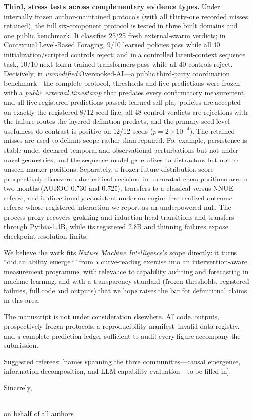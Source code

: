 \documentclass[11pt]{article}
\begin{document}
\textbf{Third, stress tests across complementary evidence types.} Under
internally frozen author-maintained protocols (with all thirty-one
recorded misses retained), the full six-component protocol is tested in
three built domains and one public benchmark. It classifies 25/25 fresh
external-swarm verdicts; in Contextual Level-Based Foraging, 9/10
learned policies pass while all 40 initialization/scripted controls
reject; and in a controlled latent-context sequence task, 10/10
next-token-trained transformers pass while all 40 controls reject.
Decisively, in \emph{unmodified} Overcooked-AI---a public third-party
coordination benchmark---the complete protocol, thresholds and five
predictions were frozen with a \emph{public external timestamp} that
predates every confirmatory measurement, and all five registered
predictions passed: learned self-play policies are accepted on exactly
the registered 8/12 seed line, all 48 control verdicts are rejections
with the failure routes the layered definition predicts, and the
primary seed-level usefulness do-contrast is positive on 12/12 seeds
($p=2\times10^{-4}$). The retained misses are used to delimit
scope rather than repaired. For example, persistence is stable under
declared temporal and observational perturbations but not under novel
geometries, and the sequence model generalizes to distractors but not to
unseen marker positions. Separately, a frozen future-distribution score
prospectively discovers value-critical decisions in uncurated chess
positions across two months (AUROC 0.730 and 0.725), transfers to a
classical-versus-NNUE referee, and is directionally consistent under an
engine-free realized-outcome referee whose registered interaction we
report as an underpowered null. The process proxy recovers grokking and
induction-head transitions and transfers through Pythia-1.4B, while its
registered 2.8B and thinning failures expose checkpoint-resolution limits.

We believe the work fits \emph{Nature Machine Intelligence}'s scope
directly: it turns ``did an ability emerge?'' from a curve-reading
exercise into an intervention-aware measurement programme, with relevance
to capability auditing and forecasting in machine learning, and with a
transparency standard (frozen thresholds, registered failures, full
code and outputs) that we hope raises the bar for definitional claims
in this area.

The manuscript is not under consideration elsewhere. All code,
outputs, prospectively frozen protocols, a reproducibility manifest,
invalid-data registry, and a complete prediction ledger sufficient to
audit every figure accompany the submission.

Suggested referees: [names spanning the three communities---causal
emergence, information decomposition, and LLM capability
evaluation---to be filled in].

\bigskip
\noindent
Sincerely,

\\
on behalf of all authors
\end{document}
